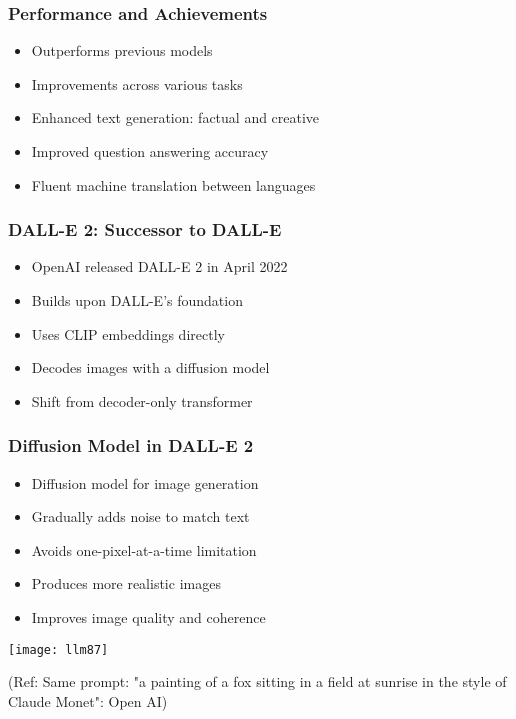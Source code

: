 \begin{frame}[fragile]\frametitle{Performance and Achievements}
    
    \begin{itemize}
        \item Outperforms previous models
        \item Improvements across various tasks
        \item Enhanced text generation: factual and creative
        \item Improved question answering accuracy
        \item Fluent machine translation between languages
    \end{itemize}
\end{frame}

\begin{frame}[fragile]\frametitle{DALL-E 2: Successor to DALL-E}
    
    \begin{itemize}
        \item OpenAI released DALL-E 2 in April 2022
        \item Builds upon DALL-E's foundation
        \item Uses CLIP embeddings directly
        \item Decodes images with a diffusion model
        \item Shift from decoder-only transformer
    \end{itemize}
\end{frame}

\begin{frame}[fragile]\frametitle{Diffusion Model in DALL-E 2}
    
    \begin{itemize}
        \item Diffusion model for image generation
        \item Gradually adds noise to match text
        \item Avoids one-pixel-at-a-time limitation
        \item Produces more realistic images
        \item Improves image quality and coherence
    \end{itemize}
	
\begin{center}
\texttt{[image: llm87]}
\end{center}		

{\tiny (Ref: Same prompt: "a painting of a fox sitting in a field at sunrise in the style of Claude Monet": Open AI)}
	
\end{frame}

